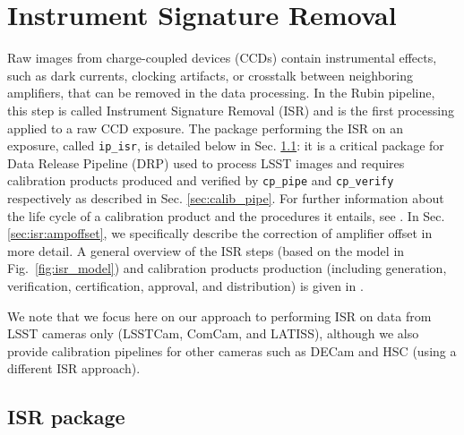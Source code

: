 \section{Instrument Signature Removal}
\label{sec:isr}

Raw images from charge-coupled devices (CCDs) contain instrumental effects, such as dark currents, clocking artifacts, or crosstalk between neighboring amplifiers, that can be removed in the data processing.
In the Rubin pipeline, this step is called Instrument Signature Removal (ISR) and is the first processing applied to a raw CCD exposure.
The package performing the ISR on an exposure, called \texttt{ip\_isr}, is detailed below in Sec. \ref{sec:ip_isr}: it is a critical package for Data Release Pipeline (DRP) used to process LSST images and requires calibration products produced and verified by \texttt{cp\_pipe} and \texttt{cp\_verify} respectively as described in Sec. \ref{sec:calib_pipe}. For further information about the life cycle of a calibration product and the procedures it entails, see \citet{DMTN-222}. In Sec. \ref{sec:isr:ampoffset}, we specifically describe the correction of amplifier offset in more detail.
A general overview of the ISR steps (based on the model in Fig.~\ref{fig:isr_model}) and calibration products production (including generation, verification, certification, approval, and distribution) is given in \citet{2024arXiv240414516P}.

We note that we focus here on our approach to performing ISR on data from LSST cameras only (LSSTCam, ComCam, and LATISS), although we also provide calibration pipelines for other cameras such as DECam and HSC (using a different ISR approach).

\subsection{ISR package}
\label{sec:ip_isr}

